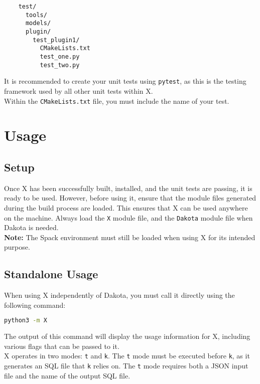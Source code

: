 \documentclass[a4paper,12pt]{article}
\begin{document}
\begin{verbatim}
    test/
      tools/
      models/
      plugin/
        test_plugin1/
          CMakeLists.txt
          test_one.py
          test_two.py
\end{verbatim}

It is recommended to create your unit tests using \texttt{pytest}, as this is the testing framework used by all other unit tests within X. \\ 

Within the \texttt{CMakeLists.txt} file, you must include the name of your test.

\section{Usage}
\subsection{Setup}

Once X has been successfully built, installed, and the unit tests are passing, it is ready to be used. However, before using it, ensure that the module files generated during the build process are loaded. This ensures that X can be used anywhere on the machine. Always load the \texttt{X} module file, and the \texttt{Dakota} module file when Dakota is needed. \\ 

\textbf{Note:} The Spack environment must still be loaded when using X for its intended purpose.

\subsection{Standalone Usage}

When using X independently of Dakota, you must call it directly using the following command:  

\vspace{1em}  
\begin{lstlisting}[language=bash]  
    python3 -m X  
\end{lstlisting}  
\vspace{1em}  

The output of this command will display the usage information for X, including various flags that can be passed to it. \\

X operates in two modes: \texttt{t} and \texttt{k}. The \texttt{t} mode must be executed before \texttt{k}, as it generates an SQL file that \texttt{k} relies on. The \texttt{t} mode requires both a JSON input file and the name of the output SQL file. \\
\end{document}
